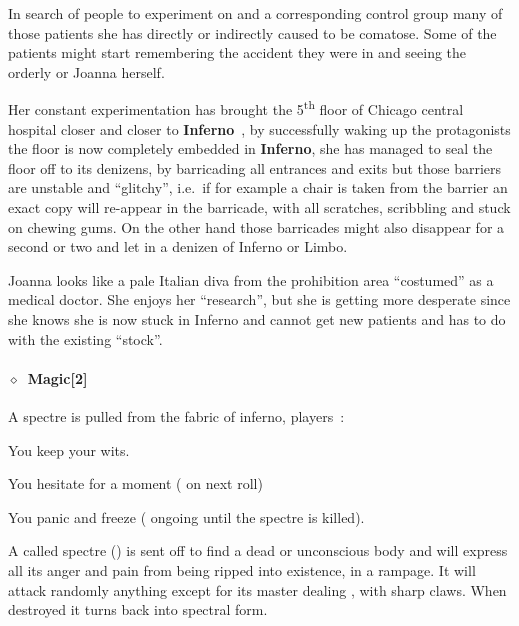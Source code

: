 \documentclass[bg-full]{resources/stylesheets/kult}
\begin{document}
In search of people to experiment on and a corresponding control group many of those patients she has directly or indirectly
caused to be comatose.  Some of the patients might start remembering the accident they were in and seeing the orderly or Joanna
herself.

Her constant experimentation has brought the 5\textsuperscript{th} floor of Chicago central hospital closer and closer to
\textbf{Inferno}~\cite[p.~314]{KULT:core}, by successfully waking up the protagonists the floor is now completely embedded in
\textbf{Inferno}, she has managed to seal the floor off to its denizens, by barricading all entrances and exits but those
barriers are unstable and “glitchy”, i.e.~if for example a chair is taken from the barrier an exact copy will re-appear in the
barricade, with all scratches, scribbling and stuck on chewing gums.  On the other hand those barricades might also disappear
for a second or two and let in a denizen of Inferno or Limbo.

Joanna looks like a pale Italian diva from the prohibition area “costumed” as a medical doctor.  She enjoys her “research”, but
she is getting more desperate since she knows she is now stuck in Inferno and cannot get new patients and has to do with the
existing “stock”.


\paragraph{\(\diamond\)~Magic[2]}%
\begin{description}[noitemsep]
  \item[Summon a Spectre] A spectre is pulled from the fabric of inferno, players~:
    \begin{description}[noitemsep]
      \item[(\KULTred{15+})] You keep your wits.
      \item[(\KULTred{10--14})] You hesitate for a moment ( on next roll)
      \item[(\KULTred{-9})] You panic and freeze ( ongoing until the spectre is killed).
    \end{description}
  \item[Manifest a Spectre] A called spectre () is sent off to find a dead or unconscious body and will
    express all its anger and pain from being ripped into existence, in a rampage.  It will attack randomly anything except for
    its master dealing , with sharp claws.  When destroyed it turns back into spectral form.
\end{description}
\end{document}
